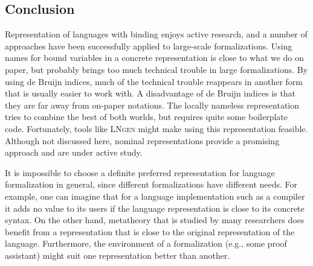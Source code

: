 \documentclass[a4paper,11pt]{article}
\newcommand{\name}[1]{\textsc{#1}\xspace}
\def\LNgen{\name{LNgen}}
\begin{document}
\subsection{Conclusion}

Representation of languages with binding enjoys active research, and a
number of approaches have been successfully applied to large-scale
formalizations.
Using names for bound variables in a concrete representation is close
to what we do on paper, but probably brings too much technical
trouble in large formalizations.
By using de Bruijn indices, much of the technical trouble reappears
in another form that is usually easier to work with.
A disadvantage of de Bruijn indices is that they are far away from
on-paper notations.
The locally nameless representation tries to combine the best of both
worlds, but requires quite some boilerplate code. Fortunately, tools
like \LNgen might make using this representation feasible. Although
not discussed here, nominal representations provide a promising
approach and are under active study.

It is impossible to choose a definite preferred representation for
language formalization in general, since different formalizations have
different needs. For example, one can imagine that for a language
implementation such as a compiler it adds no value to its users if the
language representation is close to its concrete syntax. On the other
hand, metatheory that is studied by many researchers does benefit from
a representation that is close to the original representation of the
language. Furthermore, the environment of a formalization (e.g., some
proof assistant) might suit one representation better than another.




\end{document}
